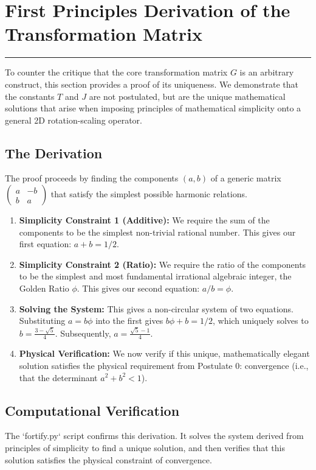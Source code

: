 \section{First Principles Derivation of the Transformation Matrix}
\label{sec:fortify_g_matrix}
\hrule
\vspace{1em}
To counter the critique that the core transformation matrix $G$ is an arbitrary construct, this section provides a proof of its uniqueness. We demonstrate that the constants $T$ and $J$ are not postulated, but are the unique mathematical solutions that arise when imposing principles of mathematical simplicity onto a general 2D rotation-scaling operator.

\subsection*{The Derivation}
The proof proceeds by finding the components $(a,b)$ of a generic matrix $\begin{pmatrix} a & -b \\ b & a \end{pmatrix}$ that satisfy the simplest possible harmonic relations.
\begin{enumerate}
    \item \textbf{Simplicity Constraint 1 (Additive):} We require the sum of the components to be the simplest non-trivial rational number. This gives our first equation: $a+b=1/2$.
    
    \item \textbf{Simplicity Constraint 2 (Ratio):} We require the ratio of the components to be the simplest and most fundamental irrational algebraic integer, the Golden Ratio $\phi$. This gives our second equation: $a/b = \phi$.

    \item \textbf{Solving the System:} This gives a non-circular system of two equations. Substituting $a=b\phi$ into the first gives $b\phi + b = 1/2$, which uniquely solves to $b = \frac{3-\sqrt{5}}{4}$. Subsequently, $a = \frac{\sqrt{5}-1}{4}$.
    
    \item \textbf{Physical Verification:} We now verify if this unique, mathematically elegant solution satisfies the physical requirement from Postulate 0: convergence (i.e., that the determinant $a^2+b^2 < 1$).
\end{enumerate}

\subsection*{Computational Verification}
The `fortify.py` script confirms this derivation. It solves the system derived from principles of simplicity to find a unique solution, and then verifies that this solution satisfies the physical constraint of convergence.


